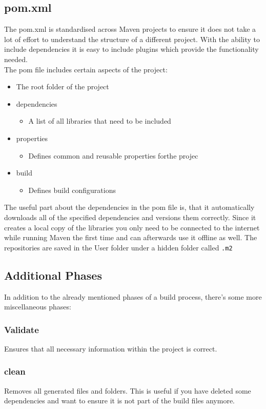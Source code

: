 \documentclass{article}
\begin{document}
	\subsection{pom.xml}
 	The pom.xml is standardised across Maven projects to ensure it does not take a lot of effort to understand the structure of a different project. With the ability to include dependencies it is easy to include plugins which provide the functionality needed. \\
 	The pom file includes certain aspects of the project:
 	\begin{itemize}
 		\item{The root folder of the project}
 		\item{dependencies}
 		\begin{itemize}
 			\item{A list of all libraries that need to be included}
 		\end{itemize}
 		\item{properties}
 		\begin{itemize}
 			\item{Defines common and reusable properties forthe projec}
 		\end{itemize}
 		\item{build}
 		\begin{itemize}
 			\item{Defines build configurations}
 		\end{itemize}
 	\end{itemize}
 	The useful part about the dependencies in the pom file is, that it automatically downloads all of the specified dependencies and versions them correctly. Since it creates a local copy of the libraries you only need to be connected to the internet while running Maven the first time and can afterwards use it offline as well. The repositories are saved in the User folder under a hidden folder called \texttt{.m2}
 	\subsection{Additional Phases}
 	In addition to the already mentioned phases of a build process, there's some more miscellaneous phases:
 	\subsubsection{Validate}
 	Ensures that all necessary information within the project is correct.
 	\subsubsection{clean}
 	Removes all generated files and folders. This is useful if you have deleted some dependencies and want to ensure it is not part of the build files anymore.
\end{document}
